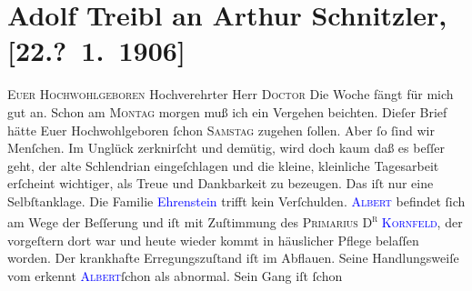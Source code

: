 

               \section[Adolf Treibl an Arthur Schnitzler, {[}22.? 1. 1906{]}]{ Adolf Treibl an Arthur Schnitzler, {[}22.? 1. 1906{]}}\nopagebreak{}\rehead{ }\normalsize\beginnumbering{} \toendnotes[C]{\smallbreak\pagebreak[2]} 
\toendnotes[C]{\smallbreak}\pstart
           \noindent{}{\pb}\textsc{Euer Hochwohlgeboren}\pend
           \pstart{}Hochverehrter Herr \textsc{Doctor}\pend\pstart
           Die Woche fängt für mich gut an. Schon am \textsc{Montag}{ }morgen muß ich ein Vergehen beichten. Dieſer Brief hätte Euer
                    Hochwohlgeboren ſchon \textsc{Samstag} zugehen ſollen. Aber ſo ſind wir Menſchen. Im Unglück zerknirſcht und
                    demütig, wird doch {\pb}kaum daß es beſſer geht, der
                    alte Schlendrian eingeſchlagen und die kleine, kleinliche Tagesarbeit erſcheint
                    wichtiger, als Treue und Dankbarkeit zu bezeugen. Das iſt nur eine
                    Selbſtanklage. Die Familie \textcolor{blue}{Ehrenstein}{}\ledrightnote{\textcolor{blue}{Alexander Ehrenstein}{\newline}\textcolor{blue}{Charlotte Ehrenstein}}
                    trifft kein Verſchulden.\pend
           \pstart
           \textcolor{blue}{\textsc{Albert}}{}\ledrightnote{\textcolor{blue}{Albert Ehrenstein}} befindet ſich am Wege der Beſſerung und iſt mit Zuſtimmung des \textsc{Prima{\pb}rius D\textsuperscript{r}}{ }\textcolor{blue}{\textsc{Kornfeld}}{}\ledrightnote{\textcolor{blue}{Sigmund Kornfeld}}, der vorgeſtern dort war und heute wieder kommt in häuslicher Pflege
                    belaſſen worden. Der krankhafte Erregungszuſtand iſt im Abflauen. Seine
                    Handlungsweiſe vom \label{K_L01575_1v}\label{K_L01575_1h} erkennt \textcolor{blue}{\textsc{Albert}}{}\ledrightnote{\textcolor{blue}{Albert Ehrenstein}}{ }ſchon als abnormal. Sein Gang iſt ſchon
